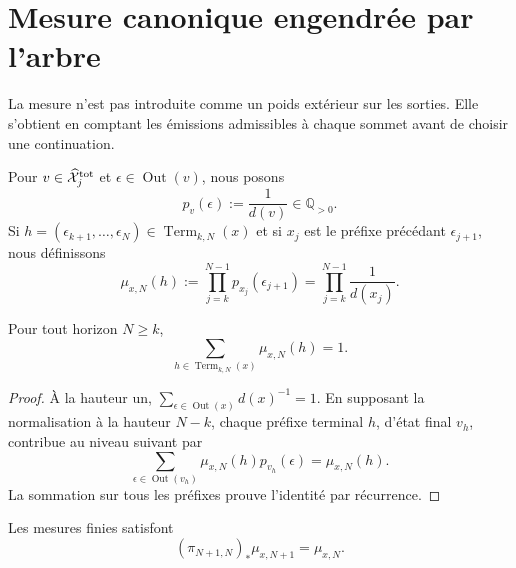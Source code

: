 \section{Mesure canonique engendrée par l'arbre}
\label{sec:continuo-comun-medida}

La mesure n'est pas introduite comme un poids extérieur sur les sorties. Elle s'obtient en comptant les émissions admissibles à chaque sommet avant de choisir une continuation.

\begin{definition}
\label{def:continuo-comun-medida-finita}
Pour \(v\in\widehat{\mathcal X}^{\rm tot}_j\) et \(\epsilon\in\operatorname{Out}(v)\), nous posons
\begin{equation}
\label{eq:continuo-comun-peso-local}
 p_v(\epsilon):=\frac{1}{d(v)}\in\mathbb Q_{>0}.
\end{equation}
Si \(h=(\epsilon_{k+1},\ldots,\epsilon_N)\in
\operatorname{Term}_{k,N}(x)\) et si \(x_j\) est le préfixe précédant \(\epsilon_{j+1}\), nous définissons
\begin{equation}
\label{eq:continuo-comun-medida-horizonte}
 \mu_{x,N}(h)
 :=\prod_{j=k}^{N-1}p_{x_j}(\epsilon_{j+1})
 =\prod_{j=k}^{N-1}\frac{1}{d(x_j)}.
\end{equation}
\end{definition}

\begin{lemma}[Normalisation]
\label{lem:continuo-comun-medida-normalizada}
Pour tout horizon \(N\geq k\),
\begin{equation}
\label{eq:continuo-comun-medida-suma-uno}
 \sum_{h\in\operatorname{Term}_{k,N}(x)}\mu_{x,N}(h)=1.
\end{equation}
\end{lemma}

\begin{proof}
À la hauteur un, \(\sum_{\epsilon\in\operatorname{Out}(x)}d(x)^{-1}=1\). En supposant la normalisation à la hauteur \(N-k\), chaque préfixe terminal \(h\), d'état final \(v_h\), contribue au niveau suivant par
\[
 \sum_{\epsilon\in\operatorname{Out}(v_h)}
 \mu_{x,N}(h)p_{v_h}(\epsilon)
 =\mu_{x,N}(h).
\]
La sommation sur tous les préfixes prouve l'identité par récurrence.
\end{proof}

\begin{proposition}
\label{prop:continuo-comun-medida-consistente}
Les mesures finies satisfont
\begin{equation}
\label{eq:continuo-comun-medida-pushforward}
 (\pi_{N+1,N})_*\mu_{x,N+1}=\mu_{x,N}.
\end{equation}
\end{proposition}

